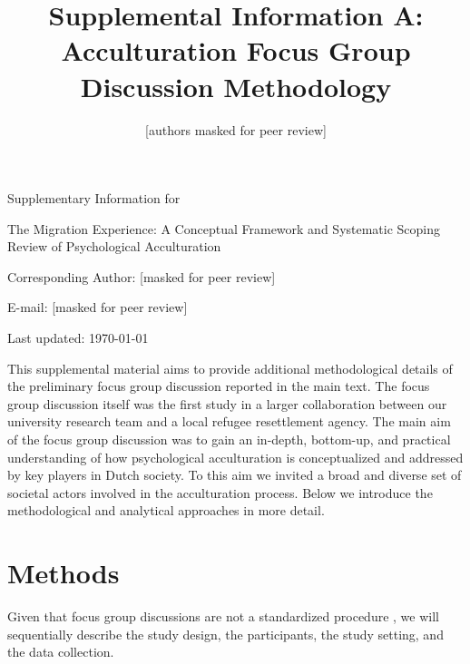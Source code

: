 \documentclass[man, 12pt, a4paper]{apa7}
\title{Supplemental Information A: Acculturation Focus Group Discussion Methodology}
\author{[authors masked for peer review]}
\begin{document}
\begin{titlepage}
	{\noindent\Large Supplementary Information for \par}
	\vspace{0.5cm}
	{\noindent\Large The Migration Experience: A Conceptual Framework and Systematic Scoping Review of Psychological Acculturation\par}
	\vspace{1.5cm}
	{\noindent\LARGE\bfseries \thetitle \par}
	\vspace{2cm}
	{\noindent\Large\itshape \theauthor \par}
	\vfill
	\noindent Corresponding Author: [masked for peer review]\par
	\noindent E-mail: [masked for peer review]\par
	\vfill

	{\noindent Last updated: \today\par}
\end{titlepage}

\begin{center}
   \textbf{\thetitle} 
\end{center}

This supplemental material aims to provide additional methodological details of the preliminary focus group discussion reported in the main text. The focus group discussion itself was the first study in a larger collaboration between our university research team and a local refugee resettlement agency. The main aim of the focus group discussion was to gain an in-depth, bottom-up, and practical understanding of how psychological acculturation is conceptualized and addressed by key players in Dutch society. To this aim we invited a broad and diverse set of societal actors involved in the acculturation process. Below we introduce the methodological and analytical approaches in more detail.

\section{Methods}

Given that focus group discussions are not a standardized procedure \citep[][]{Morgan2010, Barbour2001}, we will sequentially describe the study design, the participants, the study setting, and the data collection. 
\end{document}
